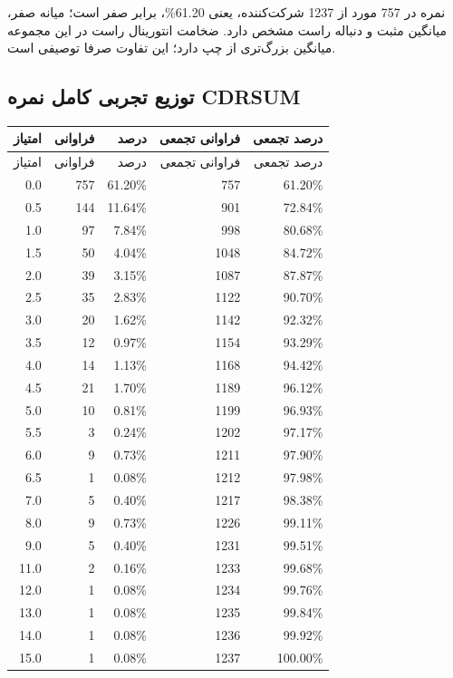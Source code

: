 \documentclass[a4paper,11pt]{article}
\newcommand{\Code}[1]{\lr{\texttt{\detokenize{#1}}}}
\begin{document}
نمره \Code{CDRSUM} در 757 مورد از 1237 شرکت‌کننده،
یعنی 61.20\%، برابر صفر است؛ میانه صفر، میانگین مثبت
و دنباله راست مشخص دارد. ضخامت انتورینال راست در این مجموعه
میانگین بزرگ‌تری از چپ دارد؛ این تفاوت صرفا توصیفی است.

\subsection*{توزیع تجربی کامل نمره CDRSUM}
\small
\begin{longtable}{ r r r r r }
\toprule
امتیاز & فراوانی & درصد & فراوانی تجمعی & درصد تجمعی \\
\midrule
\endfirsthead
\toprule
امتیاز & فراوانی & درصد & فراوانی تجمعی & درصد تجمعی \\
\midrule
\endhead
0.0 & 757 & 61.20\% & 757 & 61.20\% \\
0.5 & 144 & 11.64\% & 901 & 72.84\% \\
1.0 & 97 & 7.84\% & 998 & 80.68\% \\
1.5 & 50 & 4.04\% & 1048 & 84.72\% \\
2.0 & 39 & 3.15\% & 1087 & 87.87\% \\
2.5 & 35 & 2.83\% & 1122 & 90.70\% \\
3.0 & 20 & 1.62\% & 1142 & 92.32\% \\
3.5 & 12 & 0.97\% & 1154 & 93.29\% \\
4.0 & 14 & 1.13\% & 1168 & 94.42\% \\
4.5 & 21 & 1.70\% & 1189 & 96.12\% \\
5.0 & 10 & 0.81\% & 1199 & 96.93\% \\
5.5 & 3 & 0.24\% & 1202 & 97.17\% \\
6.0 & 9 & 0.73\% & 1211 & 97.90\% \\
6.5 & 1 & 0.08\% & 1212 & 97.98\% \\
7.0 & 5 & 0.40\% & 1217 & 98.38\% \\
8.0 & 9 & 0.73\% & 1226 & 99.11\% \\
9.0 & 5 & 0.40\% & 1231 & 99.51\% \\
11.0 & 2 & 0.16\% & 1233 & 99.68\% \\
12.0 & 1 & 0.08\% & 1234 & 99.76\% \\
13.0 & 1 & 0.08\% & 1235 & 99.84\% \\
14.0 & 1 & 0.08\% & 1236 & 99.92\% \\
15.0 & 1 & 0.08\% & 1237 & 100.00\% \\
\bottomrule
\end{longtable}
\normalsize
\end{document}
